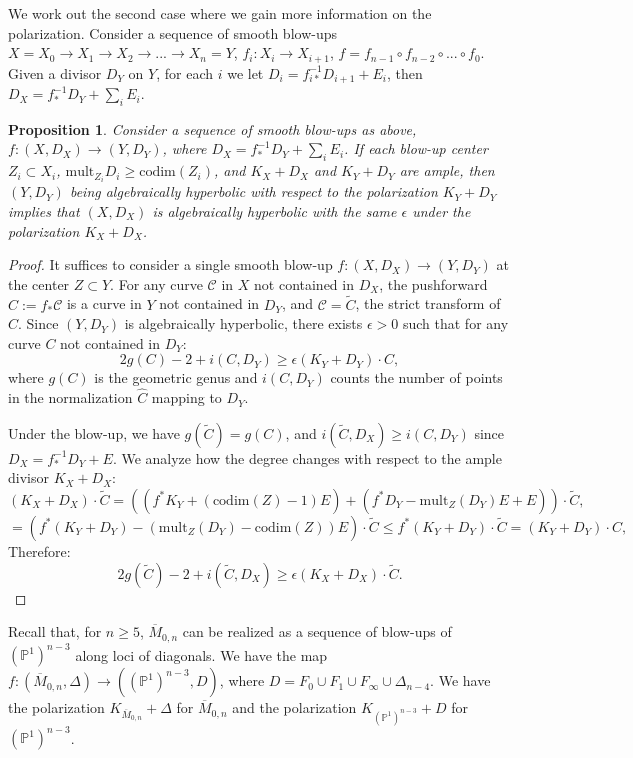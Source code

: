 \documentclass{amsart}
\newtheorem{proposition}[theorem]{Proposition}
\theoremstyle{definition}
\theoremstyle{remark}
\begin{document}
We work out the second case where we gain more information on the polarization. Consider a sequence of smooth blow-ups $X=X_0\to X_1\to X_2\to...\to X_n=Y$, $f_i:X_i\to X_{i+1}$, $f=f_{n-1}\circ f_{n-2}\circ...\circ f_0$. Given a divisor $D_Y$ on $Y$, for each $i$ we let $D_i = f_{i*}^{-1}D_{i+1}+E_i$, then $D_X = f_*^{-1}D_Y+\sum_i E_i$.
\begin{proposition}\label{prop1}
Consider a sequence of smooth blow-ups as above,
$f : (X, D_X) \to (Y, D_Y)$, 
where $D_X = f_*^{-1} D_Y + \sum_i E_i$. If each blow-up center $Z_i\subset X_i$, $\mathrm{mult}_{Z_i} D_{i} \geq \mathrm{codim}(Z_i)$, and $K_X+D_X$ and $K_Y+D_Y$ are ample, then $(Y, D_Y)$ being algebraically hyperbolic with respect to the polarization $K_Y+D_Y$ implies that
$(X, D_X)$ is algebraically hyperbolic with the same $\epsilon$ under the polarization $K_X+D_X$.
\end{proposition}

\begin{proof}
It suffices to consider a single smooth blow-up $f:(X,D_X)\to (Y,D_Y)$ at the center $Z\subset Y$. For any curve $\mathcal C$ in $X$ not contained in $D_X$, the pushforward $C := f_\ast \mathcal C$ is a curve in $Y$ not contained in $D_Y$, and $\mathcal C = \widetilde{C}$, the strict transform of $C$. Since $(Y, D_Y)$ is algebraically hyperbolic, there exists $\epsilon > 0$ such that for any curve $C$ not contained in $D_Y$:
\[ 2g(C) - 2 + i(C,D_Y) \geq \epsilon (K_Y + D_Y) \cdot C , \]
where $g(C)$ is the geometric genus and $i(C,D_Y)$ counts the number of points in the normalization $\widehat{C}$ mapping to $D_Y$.

Under the blow-up, we have $g(\widetilde{C}) = g(C)$, and $i(\widetilde{C},D_X) \geq i(C,D_Y)$ since $D_X = f_*^{-1} D_Y + E$. We analyze how the degree changes with respect to the ample divisor $K_{X} + D_X$:
\[(K_{X} + D_X) \cdot \widetilde{C}  = ((f^*K_{Y} + (\mathrm{codim}(Z)-1)E) + (f^*D_Y  - \mathrm{mult}_Z(D_Y)E+E))\cdot \widetilde{C} , \]
\[= (f^*(K_{Y} + D_Y) - (\mathrm{mult}_Z(D_Y)-\mathrm{codim}(Z)) E)\cdot \widetilde{C}  \leq f^*(K_{Y} + D_Y)\cdot \widetilde{C}  = (K_{Y} + D_Y) \cdot C, \]
Therefore:
\[ 2g(\widetilde{C}) - 2 + i(\widetilde{C},D_X) \geq \epsilon (K_{X} +D_X) \cdot  \widetilde{C}. \]


\end{proof}


Recall that, for $n\geq5$, $\overline{M}_{0,n}$ can be realized as a sequence of blow-ups of $(\mathbb P^1)^{n-3}$ along loci of diagonals. We have the map  $f:(\overline{M}_{0,n},\Delta)\to ((\mathbb P^1)^{n-3},D)$, where $D=F_0\cup F_1\cup F_\infty\cup\Delta_{n-4}$. We have the polarization  $K_{\overline{M}_{0,n}}+\Delta$ for $\overline{M}_{0,n}$ and the polarization $K_{(\mathbb P^1)^{n-3}}+D$ for $(\mathbb P^1)^{n-3}$.
\end{document}
